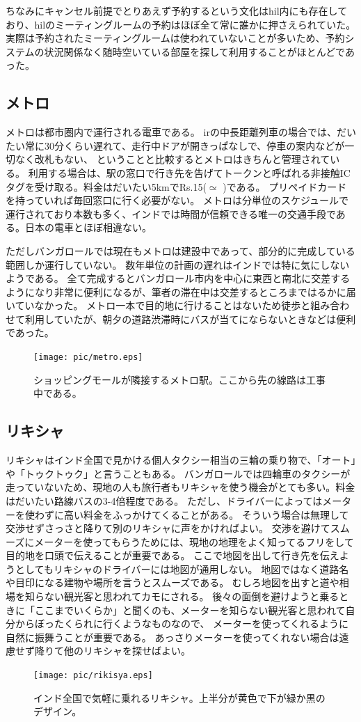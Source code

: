 \par
ちなみにキャンセル前提でとりあえず予約するという文化は\acrshort{hil}内にも存在しており、\acrshort{hil}のミーティングルームの予約はほぼ全て常に誰かに押さえられていた。
実際は予約されたミーティングルームは使われていないことが多いため、予約システムの状況関係なく随時空いている部屋を探して利用することがほとんどであった。
\subsection{メトロ}
メトロは都市圏内で運行される電車である。
\acrlong{ir}の中長距離列車の場合では、だいたい常に30分くらい遅れて、走行中ドアが開きっぱなしで、停車の案内などが一切なく改札もない、
ということと比較するとメトロはきちんと管理されている。
利用する場合は、駅の窓口で行き先を告げてトークンと呼ばれる非接触ICタグを受け取る。料金はだいたい5kmでRs.15($\simeq$ )である。
プリペイドカードを持っていれば毎回窓口に行く必要がない。
メトロは分単位のスケジュールで運行されており本数も多く、インドでは時間が信頼できる唯一の交通手段である。日本の電車とほぼ相違ない。
\par
ただしバンガロールでは現在もメトロは建設中であって、部分的に完成している範囲しか運行していない。
数年単位の計画の遅れはインドでは特に気にしないようである。
全て完成するとバンガロール市内を中心に東西と南北に交差するようになり非常に便利になるが、筆者の滞在中は交差するところまではるかに届いていなかった。
メトロ一本で目的地に行けることはないため徒歩と組み合わせて利用していたが、朝夕の道路渋滞時にバスが当てにならないときなどは便利であった。
\begin{figure}[ht]
  \centering
  \texttt{[image: pic/metro.eps]}
  \caption{ショッピングモールが隣接するメトロ駅。ここから先の線路は工事中である。}
\end{figure}
\subsection{リキシャ}
リキシャはインド全国で見かける個人タクシー相当の三輪の乗り物で、「オート」や「トゥクトゥク」と言うこともある。
バンガロールでは四輪車のタクシーが走っていないため、現地の人も旅行者もリキシャを使う機会がとても多い。料金はだいたい路線バスの3-4倍程度である。
ただし、ドライバーによってはメーターを使わずに高い料金をふっかけてくることがある。
そういう場合は無理して交渉せずさっさと降りて別のリキシャに声をかければよい。
交渉を避けてスムーズにメーターを使ってもらうためには、現地の地理をよく知ってるフリをして目的地を口頭で伝えることが重要である。
ここで地図を出して行き先を伝えようとしてもリキシャのドライバーには地図が通用しない。
地図ではなく道路名や目印になる建物や場所を言うとスムーズである。
むしろ地図を出すと道や相場を知らない観光客と思われてカモにされる。
後々の面倒を避けようと乗るときに「ここまでいくらか」と聞くのも、メーターを知らない観光客と思われて自分からぼったくられに行くようなものなので、
メーターを使ってくれるように自然に振舞うことが重要である。
あっさりメーターを使ってくれない場合は遠慮せず降りて他のリキシャを探せばよい。
\begin{figure}[ht]
  \centering
  \texttt{[image: pic/rikisya.eps]}
  \caption{インド全国で気軽に乗れるリキシャ。上半分が黄色で下が緑か黒のデザイン。}
\end{figure}
